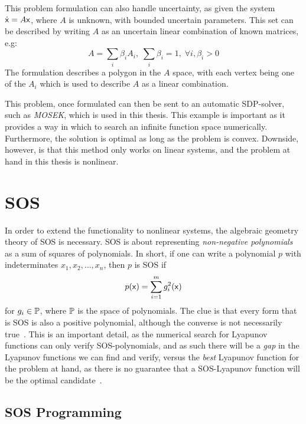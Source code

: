 This problem formulation can also handle uncertainty, as given the system
\(\dot{\vect{x}} = A\vect{x}\), where \(A\) is unknown, with bounded uncertain
parameters. This set can be described by writing \(A\) as an uncertain linear
combination of known matrices, e.g:
\[
  A = \sum_{i} \beta_{i}A_{i}, \; \sum_{i}\beta_{i} = 1, \; \forall i,\beta_{i}
  > 0
\]
The formulation describes a polygon in the \(A\) space, with each vertex being
one of the \(A_{i}\) which is used to describe \(A\) as a linear combination.

This problem, once formulated can then be sent to an automatic \ac{SDP}-solver,
such as \textit{MOSEK}\cite{mosek}, which is used in this thesis. This example
is important as it provides a way in which to search an infinite function space
numerically. Furthermore, the solution is optimal as long as the problem is
convex. Downside, however, is that this method only works on linear systems, and
the problem at hand in this thesis is nonlinear.

\section{SOS}

In order to extend the functionality to nonlinear systems, the algebraic
geometry theory of \ac{SOS} is necessary. \ac{SOS} is about representing
\textit{non-negative polynomials} as a sum of squares of polynomials. In short,
if one can write a polynomial \(p\) with indeterminates \(x_1,x_2,\ldots,x_n\),
then \(p\) is \ac{SOS} if
\[
  p(\vect{x}) = \sum_{i=1}^{m}g_i^2(\vect{x})
\]
for \(g_i \in \P\), where \(\P\) is the space of polynomials. The clue is that
every form that is \ac{SOS} is also a positive polynomial, although the converse
is not necessarily true~\cite{majumdarFunnelLibrariesRealtime2017}. This is an
important detail, as the numerical search for Lyapunov functions can only verify
\ac{SOS}-polynomials, and as such there will be a \textit{gap} in the Lyapunov
functions we can find and verify, versus the \textit{best} Lyapunov function for
the problem at hand, as there is no guarantee that a \ac{SOS}-Lyapunov function
will be the optimal candidate~\cite{parilloStructuredSemidefinitePrograms}.

\subsection{SOS Programming}

